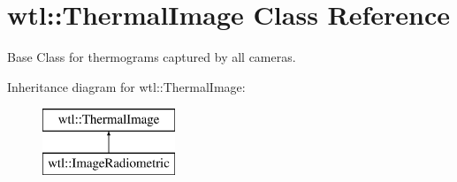 \hypertarget{classwtl_1_1_thermal_image}{}\section{wtl\+:\+:Thermal\+Image Class Reference}
\label{classwtl_1_1_thermal_image}


Base Class for thermograms captured by all cameras.  


Inheritance diagram for wtl\+:\+:Thermal\+Image\+:\begin{figure}[H]
\begin{center}
\leavevmode
\includegraphics[height=2.000000cm]{classwtl_1_1_thermal_image}
\end{center}
\end{figure}
